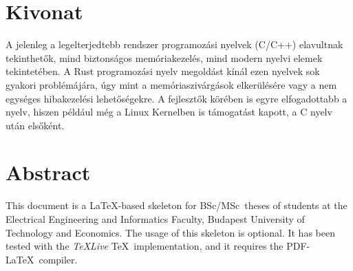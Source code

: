\setcounter{page}{1}

\selecthungarian

\chapter*{Kivonat}

A jelenleg a legelterjedtebb rendszer programozási nyelvek (C/C++) elavultnak tekinthetők, mind biztonságos memóriakezelés, mind modern nyelvi elemek tekintetében. A Rust programozási nyelv megoldást kínál ezen nyelvek sok gyakori problémájára, úgy mint a memóriaszivárgások elkerülésére vagy a nem egységes hibakezelési lehetőségekre. A fejlesztők körében is egyre elfogadottabb a nyelv, hiszen például még a Linux Kernelben is támogatást kapott, a C nyelv után elsőként.\cite{FirstRustCommit}


\vfill
\selectenglish


\chapter*{Abstract}

This document is a \LaTeX-based skeleton for BSc/MSc~theses of students at the Electrical Engineering and Informatics Faculty, Budapest University of Technology and Economics. The usage of this skeleton is optional. It has been tested with the \emph{TeXLive} \TeX~implementation, and it requires the PDF-\LaTeX~compiler.


\vfill
\selectthesislanguage

\setcounter{romanPage}{\value{page}}

